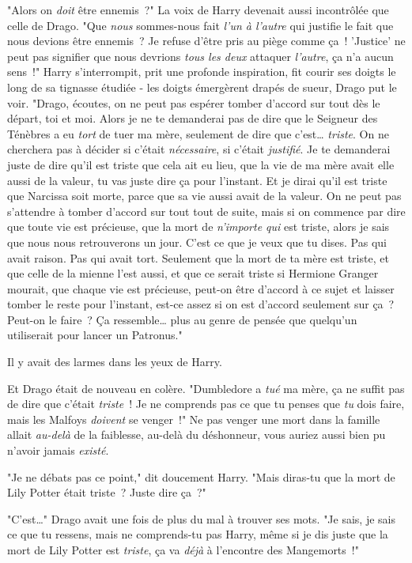 "Alors on \emph{doit} être ennemis~?" La voix de Harry devenait aussi incontrôlée que celle de Drago. "Que \emph{nous} sommes-nous fait \emph{l'un à l'autre} qui justifie le fait que nous devions être ennemis~? Je refuse d'être pris au piège comme ça~! 'Justice' ne peut pas signifier que nous devrions \emph{tous les deux} attaquer \emph{l'autre}, ça n'a aucun sens~!" Harry s'interrompit, prit une profonde inspiration, fit courir ses doigts le long de sa tignasse étudiée - les doigts émergèrent drapés de sueur, Drago put le voir. "Drago, écoutes, on ne peut pas espérer tomber d'accord sur tout dès le départ, toi et moi. Alors je ne te demanderai pas de dire que le Seigneur des Ténèbres a eu \emph{tort} de tuer ma mère, seulement de dire que c'est… \emph{triste}. On ne cherchera pas à décider si c'était \emph{nécessaire}, si c'était \emph{justifié}. Je te demanderai juste de dire qu'il est triste que cela ait eu lieu, que la vie de ma mère avait elle aussi de la valeur, tu vas juste dire ça pour l'instant. Et je dirai qu'il est triste que Narcissa soit morte, parce que sa vie aussi avait de la valeur. On ne peut pas s'attendre à tomber d'accord sur tout tout de suite, mais si on commence par dire que toute vie est précieuse, que la mort de \emph{n'importe qui} est triste, alors je sais que nous nous retrouverons un jour. C'est ce que je veux que tu dises. Pas qui avait raison. Pas qui avait tort. Seulement que la mort de ta mère est triste, et que celle de la mienne l'est aussi, et que ce serait triste si Hermione Granger mourait, que chaque vie est précieuse, peut-on être d'accord à ce sujet et laisser tomber le reste pour l'instant, est-ce assez si on est d'accord seulement sur ça~? Peut-on le faire~? Ça ressemble… plus au genre de pensée que quelqu'un utiliserait pour lancer un Patronus."

Il y avait des larmes dans les yeux de Harry.

Et Drago était de nouveau en colère. "Dumbledore a \emph{tué} ma mère, ça ne suffit pas de dire que c'était \emph{triste}~! Je ne comprends pas ce que tu penses que \emph{tu} dois faire, mais les Malfoys \emph{doivent} se venger~!" Ne pas venger une mort dans la famille allait \emph{au-delà} de la faiblesse, au-delà du déshonneur, vous auriez aussi bien pu n'avoir jamais \emph{existé}.

"Je ne débats pas ce point," dit doucement Harry. "Mais diras-tu que la mort de Lily Potter était triste~? Juste dire ça~?"

"C'est…" Drago avait une fois de plus du mal à trouver ses mots. "Je sais, je sais ce que tu ressens, mais ne comprends-tu pas Harry, même si je dis juste que la mort de Lily Potter est \emph{triste}, ça va \emph{déjà} à l'encontre des Mangemorts~!"

